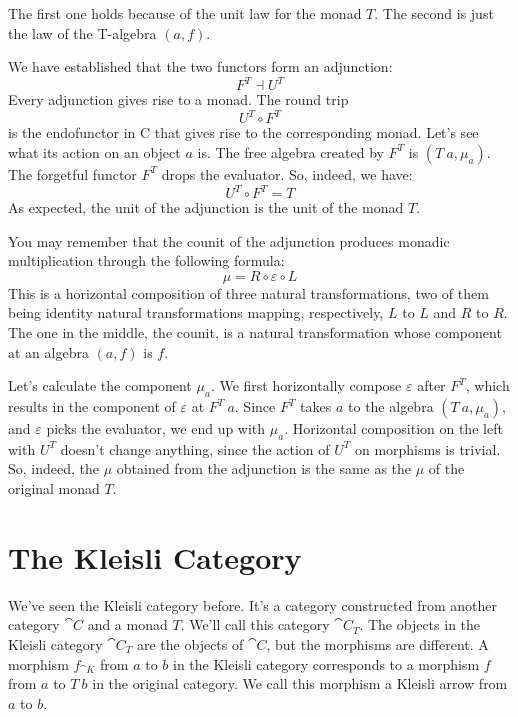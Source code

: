 \noindent
The first one holds because of the unit law for the monad $T$.
The second is just the law of the T-algebra $(a, f)$.

We have established that the two functors form an adjunction:
\[F^T \dashv U^T\]
Every adjunction gives rise to a monad. The round trip
\[U^T \circ F^T\]
is the endofunctor in C that gives rise to the corresponding monad.
Let's see what its action on an object $a$ is. The free algebra
created by $F^T$ is $(T\ a, \mu_a)$. The forgetful functor
$F^T$ drops the evaluator. So, indeed, we have:
\[U^T \circ F^T = T\]
As expected, the unit of the adjunction is the unit of the monad $T$.

You may remember that the counit of the adjunction produces monadic
multiplication through the following formula:
\[\mu = R \circ \varepsilon \circ L\]
This is a horizontal composition of three natural transformations, two
of them being identity natural transformations mapping, respectively,
$L$ to $L$ and $R$ to $R$. The one in the
middle, the counit, is a natural transformation whose component at an
algebra $(a, f)$ is $f$.

Let's calculate the component $\mu_a$. We first horizontally compose
$\varepsilon$ after $F^T$, which results in the component of
$\varepsilon$ at $F^T\ a$. Since $F^T$ takes $a$ to the
algebra $(T\ a, \mu_a)$, and $\varepsilon$ picks the evaluator, we end
up with $\mu_a$. Horizontal composition on the left with $U^T$
doesn't change anything, since the action of $U^T$ on morphisms is
trivial. So, indeed, the $\mu$ obtained from the adjunction is the
same as the $\mu$ of the original monad $T$.

\section{The Kleisli Category}

We've seen the Kleisli category before. It's a category constructed from
another category $\cat{C}$ and a monad $T$. We'll call this
category $\cat{C}_T$. The objects in the Kleisli category
$\cat{C}_T$ are the objects of $\cat{C}$, but the morphisms
are different. A morphism $f_{\cat{K}}$ from $a$ to $b$ in
the Kleisli category corresponds to a morphism $f$ from
$a$ to $T\ b$ in the original category. We call this
morphism a Kleisli arrow from $a$ to $b$.

